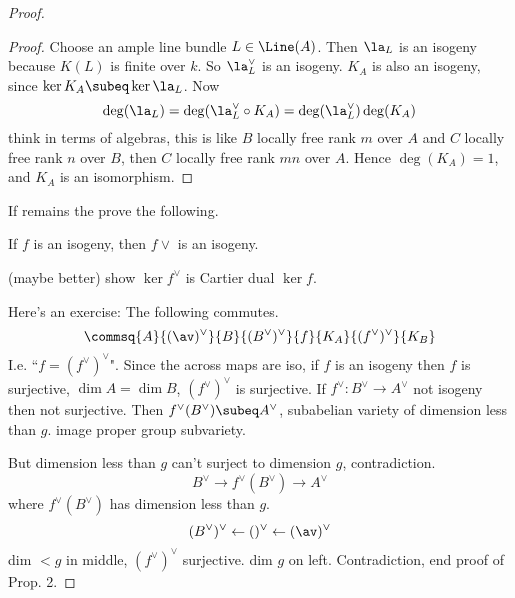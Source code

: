 \begin{proof}
\begin{proof}
Choose an ample line bundle $L\in \Line(A)$. Then $\la_L$ is an isogeny because $K(L)$ is finite over $k$. So $\la_L^{\vee}$ is an isogeny. $K_A$ is also an isogeny, since $\ker K_A\subeq \ker \la_L$. Now 
\[
\deg(\la_L)=\deg(\la_L^{\vee}\circ K_A)=\deg(\la_L^{\vee})\deg(K_A)
\]
think in terms of algebras, this is like $B$ locally free rank $m$ over $A$ and $C$ locally free rank $n$ over $B$, then $C$ locally free rank $mn$ over $A$.
Hence $\deg(K_A)=1$, and $K_A$ is an isomorphism.
\end{proof}
If remains the prove the following.
\begin{lem}
If $f$ is an isogeny, then $f\vee$ is an isogeny. 
\end{lem}
\begin{rem}
(maybe better) show $\ker f^{\vee}$ is Cartier dual  $\ker f$.
\end{rem}
Here's an exercise: The following commutes.
\[
\commsq{A}{(\av)^{\vee}}{B}{(B^{\vee})^{\vee}}{f}{K_A}{(f^{\vee})^{\vee}}{K_B}
\]
I.e. ``$f=(f^{\vee})^{\vee}$". Since the across maps are iso, if $f$ is an isogeny then $f$ is surjective, $\dim A=\dim B$, $(f^{\vee})^{\vee}$ is surjective. If $f^{\vee}:B^{\vee}\to A^{\vee}$ not isogeny then not surjective. Then $f^{\vee}(B^{\vee})\subeq A^{\vee}$, subabelian variety of dimension less than $g$. 
image proper group subvariety.

But dimension less than $g$ can't surject to dimension $g$, contradiction.
\[
B^{\vee}\to f^{\vee}(B^{\vee}) \to A^{\vee}
\]
where $f^{\vee}(B^{\vee})$ has dimension less than $g$.
\[
(B^{\vee})^{\vee} \leftarrow ()^{\vee} \leftarrow (\av)^{\vee}
\]
dim $<g$ in middle, $(f^{\vee})^{\vee}$ surjective. dim $g$ on left. Contradiction, end proof of Prop. 2. 
\end{proof}%
